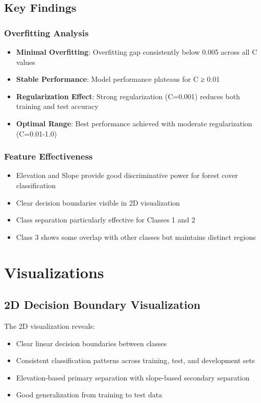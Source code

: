 \documentclass[12pt,a4paper]{article}
\begin{document}
\subsection{Key Findings}

\subsubsection{Overfitting Analysis}
\begin{itemize}
    \item \textbf{Minimal Overfitting}: Overfitting gap consistently below 0.005 across all C values
    \item \textbf{Stable Performance}: Model performance plateaus for C ≥ 0.01
    \item \textbf{Regularization Effect}: Strong regularization (C=0.001) reduces both training and test accuracy
    \item \textbf{Optimal Range}: Best performance achieved with moderate regularization (C=0.01-1.0)
\end{itemize}

\subsubsection{Feature Effectiveness}
\begin{itemize}
    \item Elevation and Slope provide good discriminative power for forest cover classification
    \item Clear decision boundaries visible in 2D visualization
    \item Class separation particularly effective for Classes 1 and 2
    \item Class 3 shows some overlap with other classes but maintains distinct regions
\end{itemize}

\section{Visualizations}

\subsection{2D Decision Boundary Visualization}
The 2D visualization reveals:
\begin{itemize}
    \item Clear linear decision boundaries between classes
    \item Consistent classification patterns across training, test, and development sets
    \item Elevation-based primary separation with slope-based secondary separation
    \item Good generalization from training to test data
\end{itemize}
\end{document}
